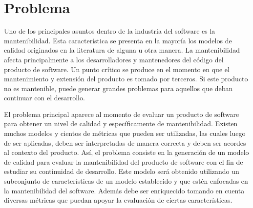 

\chapter{Problema}

Uno de los principales asuntos dentro de la industria del software es la
mantenibilidad. Esta característica se presenta en la mayoría los
modelos de calidad originados en la literatura de alguna u otra manera.
La mantenibilidad afecta principalmente a los desarrolladores y mantenedores del código
del producto de software.
Un punto crítico se produce en el momento en que el mantenimiento y extensión del producto
es tomado por terceros. Si este producto no es mantenible, puede generar grandes problemas
para aquellos que deban continuar con el desarrollo.

El problema principal aparece al momento de evaluar un producto de software
para obtener un nivel de calidad y específicamente de mantenibilidad. Existen
muchos modelos y cientos de métricas que pueden ser utilizadas, las cuales
luego de ser aplicadas, deben ser interpretadas de manera correcta y deben ser acordes
al contexto del producto. Así, el problema consiste en la generación
de un modelo de calidad para evaluar la mantenibilidad del producto de software
con el fin de estudiar su continuidad de desarrollo. Este modelo será obtenido
utilizando un subconjunto de características de un modelo establecido y que
estén enfocadas en la mantenibilidad del software. Además debe ser enriquecido
tomando en cuenta diversas métricas que puedan apoyar la evaluación de ciertas
características.
